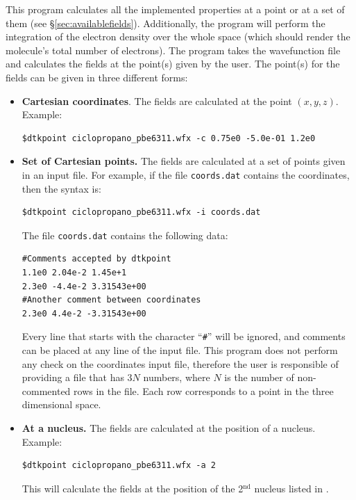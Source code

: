 This program calculates all the implemented properties at a point or at a set of them (see \S \ref{sec:availablefields}). Additionally, the program will perform the integration of the electron density over the whole space (which should render the molecule's total number of electrons). The program takes the wavefunction file and calculates the fields at the point(s) given by the user. The point(s) for the fields can be given in three different forms:
\begin{itemize}
   \item \textbf{Cartesian coordinates}. The fields are calculated at the point $(x,y,z)$. Example:\\
      \begin{lstlisting}
$dtkpoint ciclopropano_pbe6311.wfx -c 0.75e0 -5.0e-01 1.2e0
\end{lstlisting}
   \item \textbf{Set of Cartesian points.} The fields are calculated at a set of points given in an input file. For example, if the file \texttt{coords.dat} contains the coordinates, then the syntax is:\\
      \begin{lstlisting}
$dtkpoint ciclopropano_pbe6311.wfx -i coords.dat
\end{lstlisting}
      
      The file \texttt{coords.dat} contains the following data:
      \begin{verbatim}
#Comments accepted by dtkpoint
1.1e0 2.04e-2 1.45e+1
2.3e0 -4.4e-2 3.31543e+00
#Another comment between coordinates
2.3e0 4.4e-2 -3.31543e+00
      \end{verbatim}
      Every line that starts with the character ``\texttt{\#}'' will be ignored,
      and comments can be placed at any line of the input file. This program
      does not perform any check on the coordinates input file, therefore the
      user is responsible of providing a file that has $3N$ numbers, where $N$
      is the number of non-commented rows in the file. Each row corresponds to
      a point in the three dimensional space.
      \item \textbf{At a nucleus.} The fields are calculated at the position of a nucleus. Example:
         \begin{lstlisting}
$dtkpoint ciclopropano_pbe6311.wfx -a 2
\end{lstlisting}
   This will calculate the fields at the position of the 2$^{\textrm{nd}}$ nucleus listed in \wfexfile.
\end{itemize}


